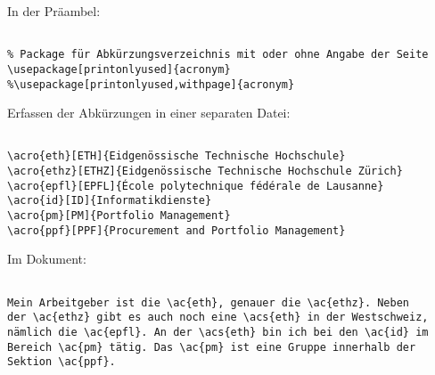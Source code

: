 
In der Präambel:

\begin{verbatim}

% Package für Abkürzungsverzeichnis mit oder ohne Angabe der Seite
\usepackage[printonlyused]{acronym}
%\usepackage[printonlyused,withpage]{acronym}

\end{verbatim}

\tcblower

Erfassen der Abkürzungen in einer separaten Datei:

\begin{verbatim}

\acro{eth}[ETH]{Eidgenössische Technische Hochschule}
\acro{ethz}[ETHZ]{Eidgenössische Technische Hochschule Zürich}
\acro{epfl}[EPFL]{École polytechnique fédérale de Lausanne}
\acro{id}[ID]{Informatikdienste}
\acro{pm}[PM]{Portfolio Management}
\acro{ppf}[PPF]{Procurement and Portfolio Management}

\end{verbatim}


Im Dokument: 

\begin{verbatim}

Mein Arbeitgeber ist die \ac{eth}, genauer die \ac{ethz}. Neben 
der \ac{ethz} gibt es auch noch eine \acs{eth} in der Westschweiz, 
nämlich die \ac{epfl}. An der \acs{eth} bin ich bei den \ac{id} im 
Bereich \ac{pm} tätig. Das \ac{pm} ist eine Gruppe innerhalb der 
Sektion \ac{ppf}.

\end{verbatim}
